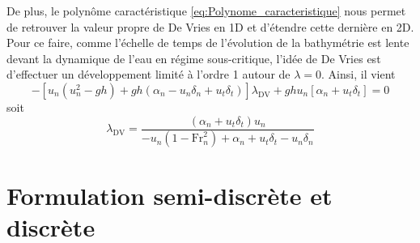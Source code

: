 \documentclass[11pt, a4paper, oneside]{report}
\begin{document}
\begin{samepage}
De plus, le polynôme caractéristique \eqref{eq:Polynome_caracteristique} nous permet de retrouver la valeur propre de De Vries en 1D et d'étendre cette dernière en 2D. \\
Pour ce faire, comme l'échelle de temps de l'évolution de la bathymétrie est lente devant la dynamique de l'eau en régime sous-critique, l'idée de De Vries \cite{vries1965considerations} est d'effectuer un développement limité à l'ordre 1 autour de $\lambda = 0$.
Ainsi, il vient
\begin{equation}
    - \left[ u_n(u_n^2 - gh) + gh \left( \alpha_n - u_n \delta_n + u_t \delta_t \right) \right] \lambda_\text{DV} + gh u_n \left[ \alpha_n + u_t \delta_t \right] = 0
\end{equation}
soit
\begin{equation}
    \lambda_\text{DV} = \frac{\left( \alpha_n + u_t \delta_t \right) u_n}{-u_n \left( 1 - \text{Fr}_n^2 \right) + \alpha_n + u_t \delta_t - u_n \delta_n}
\end{equation}
\end{samepage}

\section{Formulation semi-discrète et discrète}
\end{document}
